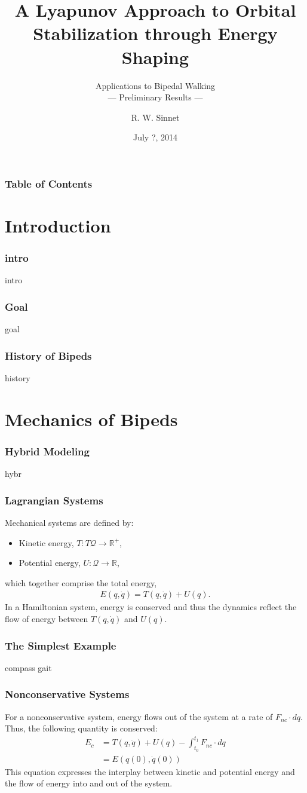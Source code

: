 \documentclass{beamer}
\title[Energy Shaping]{A Lyapunov Approach to Orbital \\Stabilization through Energy Shaping}
\subtitle{Applications to Bipedal Walking\\--- Preliminary Results ---}
\author{R. W. Sinnet}
\institute{Department of Mechanical Engineering\\ Texas A\&M University}
\date{July ?, 2014}
\newcommand{\R}{\mathbb{R}}
\newcommand{\sQ}{\mathcal{Q}}
\newcommand{\nc}{\mathit{nc}}
\begin{document}
\frame{\titlepage}

\begin{frame}
  \frametitle{Table of Contents}
  \tableofcontents
\end{frame}

\section{Introduction}
\begin{frame}
  \frametitle{intro}
  intro
\end{frame}

\begin{frame}
  \frametitle{Goal}
  goal
\end{frame}

\begin{frame}
  \frametitle{History of Bipeds}
  history
\end{frame}

\section{Mechanics of Bipeds}
\begin{frame}
  \frametitle{Hybrid Modeling}
  hybr
\end{frame}

\begin{frame}
  \frametitle{Lagrangian Systems}
  Mechanical systems are defined by:
  \begin{itemize}
  \item Kinetic energy, $T : T\sQ \to \R^+$,\\
  \item  Potential energy, $U : \sQ \to \R$,
  \end{itemize}
  which together comprise the total energy,
  \begin{align*}
    E(q, \dot q) = T(q, \dot q) + U(q).
  \end{align*}
  In a Hamiltonian system, energy is conserved and thus the dynamics reflect the flow of energy between $T(q, \dot q)$ and $U(q)$.
\end{frame}

\begin{frame}
  \frametitle{The Simplest Example}
  compass gait
\end{frame}

\begin{frame}
  \frametitle{Nonconservative Systems}
  For a nonconservative system, energy flows out of the system at a rate of $F_{\nc} \cdot dq$. Thus, the following quantity is conserved:
  \begin{align*}
    E_{c} &= T(q, \dot q) + U(q) - \int_{t_{0}}^{t_{1}} \! F_{\nc} \cdot dq\\
    &= E(q(0), \dot q(0))
  \end{align*}
  This equation expresses the interplay between kinetic and potential energy and the flow of energy into and out of the system.
\end{frame}
\end{document}
